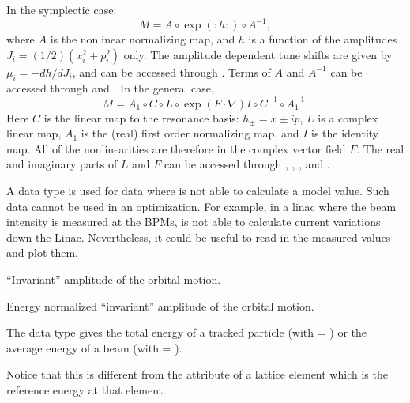 \begin{description}
{{{{{{In the symplectic case:
\begin{equation} \label{normalform1}
  M = A\circ \exp\left(:h:\right)\circ A^{-1},
\end{equation}
where $A$ is the nonlinear normalizing map, and $h$ is a function of the amplitudes $J_i =
(1/2)(x_i^2 + p_i^2)$ only. The amplitude dependent tune shifts are given by $\mu_i =
-dh/dJ_i$, and can be accessed through . Terms of $A$ and $A^{-1}$ can be
accessed through  and .  In the general case,
\begin{equation} \label{normalform2}
M = A_1\circ C \circ L \circ \exp\left(F\cdot\nabla\right)I\circ C^{-1} \circ A_1^{-1}.
\end{equation}
Here $C$ is the linear map to the resonance basis: $h_\pm = x \pm i p$, $L$ is a complex
linear map, $A_1$ is the (real) first order normalizing map, and $I$ is the identity
map. All of the nonlinearities are therefore in the complex vector field $F$. The real and
imaginary parts of $L$ and $F$ can be accessed through , ,
, and .

  \item[null] \Newline {}
A  data type is used for data where \tao is not able to calculate a model value. Such data
cannot be used in an optimization. For example, in a linac where the beam intensity is measured at
the BPMs, \tao is not able to calculate current variations down the Linac. Nevertheless, it
could be useful to read in the measured values and plot them.

  \item[orbit.amp_a, .amp_b] \Newline {}
``Invariant'' amplitude of the orbital motion.

  \item[orbit.norm_amp_a, .norm_amp_b] \Newline {}
Energy normalized ``invariant'' amplitude of the orbital motion.

  \item[orbit.energy] \Newline {}
The  data type gives the total energy of a tracked particle (with
 = ) or the average energy of a beam (with  =
).

Notice that this is different from the  attribute of a lattice element which
is the reference energy at that element.

}}}}}}
\end{description}
